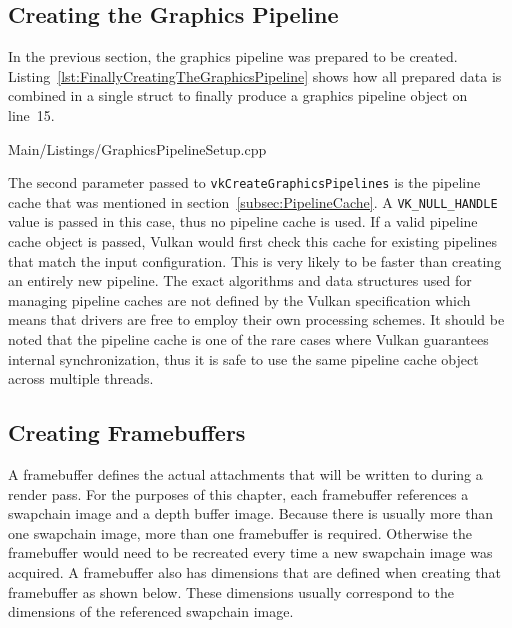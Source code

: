     \subsection{Creating the Graphics Pipeline}
    \label{sub:ActualGraphicsPipelineCreation}
      In the previous section, the graphics pipeline was prepared to be created.
      Listing~\ref{lst:FinallyCreatingTheGraphicsPipeline} shows how all prepared data is combined in a single struct to finally produce a graphics pipeline object on line~15.

      
      {Main/Listings/GraphicsPipelineSetup.cpp}

      The second parameter passed to \lstinline{vkCreateGraphicsPipelines} is the pipeline cache that was mentioned in section~\ref{subsec:PipelineCache}.
      A \lstinline{VK_NULL_HANDLE} value is passed in this case, thus no pipeline cache is used.
      If a valid pipeline cache object is passed, Vulkan would first check this cache for existing pipelines that match the input configuration.
      This is very likely to be faster than creating an entirely new pipeline.
      The exact algorithms and data structures used for managing pipeline caches are not defined by the Vulkan specification which means that \glspl{driver} are free to employ their own processing schemes.
      It should be noted that the pipeline cache is one of the rare cases where Vulkan guarantees internal synchronization, thus it is safe to use the same pipeline cache object across multiple threads.


    \subsection{Creating Framebuffers}
    \label{subsec:CreatingFramebuffers}
      A framebuffer defines the actual attachments that will be written to during a render pass.
      For the purposes of this chapter, each framebuffer references a swapchain image and a depth buffer image.
      Because there is usually more than one swapchain image, more than one framebuffer is required.
      Otherwise the framebuffer would need to be recreated every time a new swapchain image was acquired.
      A framebuffer also has dimensions that are defined when creating that framebuffer as shown below.
      These dimensions usually correspond to the dimensions of the referenced swapchain image.

